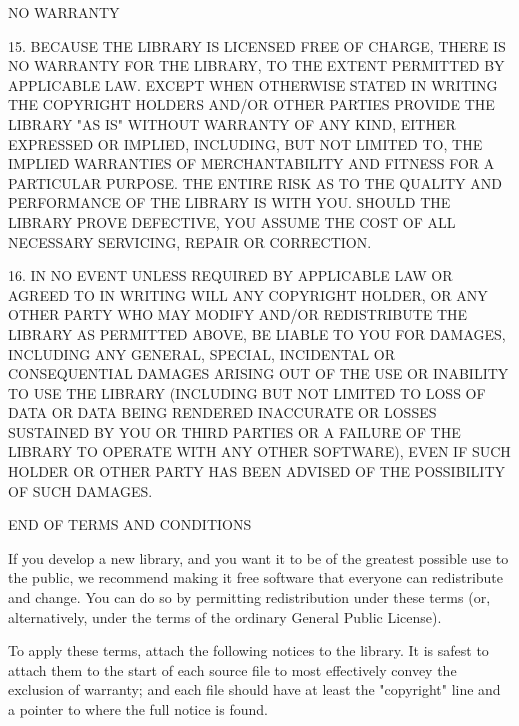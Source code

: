 \begin{center}
NO WARRANTY
\end{center}

15. BECAUSE THE LIBRARY IS LICENSED FREE OF CHARGE, THERE IS NO
WARRANTY FOR THE LIBRARY, TO THE EXTENT PERMITTED BY APPLICABLE LAW.
EXCEPT WHEN OTHERWISE STATED IN WRITING THE COPYRIGHT HOLDERS AND/OR
OTHER PARTIES PROVIDE THE LIBRARY "AS IS" WITHOUT WARRANTY OF ANY
KIND, EITHER EXPRESSED OR IMPLIED, INCLUDING, BUT NOT LIMITED TO, THE
IMPLIED WARRANTIES OF MERCHANTABILITY AND FITNESS FOR A PARTICULAR
PURPOSE. THE ENTIRE RISK AS TO THE QUALITY AND PERFORMANCE OF THE
LIBRARY IS WITH YOU. SHOULD THE LIBRARY PROVE DEFECTIVE, YOU ASSUME
THE COST OF ALL NECESSARY SERVICING, REPAIR OR CORRECTION.

16. IN NO EVENT UNLESS REQUIRED BY APPLICABLE LAW OR AGREED TO IN
WRITING WILL ANY COPYRIGHT HOLDER, OR ANY OTHER PARTY WHO MAY MODIFY
AND/OR REDISTRIBUTE THE LIBRARY AS PERMITTED ABOVE, BE LIABLE TO YOU
FOR DAMAGES, INCLUDING ANY GENERAL, SPECIAL, INCIDENTAL OR
CONSEQUENTIAL DAMAGES ARISING OUT OF THE USE OR INABILITY TO USE THE
LIBRARY (INCLUDING BUT NOT LIMITED TO LOSS OF DATA OR DATA BEING
RENDERED INACCURATE OR LOSSES SUSTAINED BY YOU OR THIRD PARTIES OR A
FAILURE OF THE LIBRARY TO OPERATE WITH ANY OTHER SOFTWARE), EVEN IF
SUCH HOLDER OR OTHER PARTY HAS BEEN ADVISED OF THE POSSIBILITY OF SUCH
DAMAGES.


\begin{center}
END OF TERMS AND CONDITIONS
\end{center}


If you develop a new library, and you want it to be of the greatest
possible use to the public, we recommend making it free software that
everyone can redistribute and change. You can do so by permitting
redistribution under these terms (or, alternatively, under the terms of the
ordinary General Public License).

To apply these terms, attach the following notices to the library. It is
safest to attach them to the start of each source file to most effectively
convey the exclusion of warranty; and each file should have at least the
"copyright" line and a pointer to where the full notice is found.

